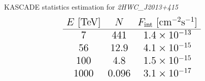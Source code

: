 \begin{frame}{KASCADE statistics estimation for \textit{2HWC\_J2013+415}}
\[
\Large
\begin{array}{ccc}
E~[\mathrm{TeV}] & N & F_\mathrm{int}~[\mathrm{cm}^{-2}\mathrm{s}^{-1}] \\\hline
7 & 441 & 1.4\times10^{-13}\\
56 & 12.9 & 4.1\times10^{-15}\\
100 & 4.8 & 1.5\times10^{-15}\\
1000 & 0.096 & 3.1\times10^{-17}\\
\end{array}
\]
\end{frame}
